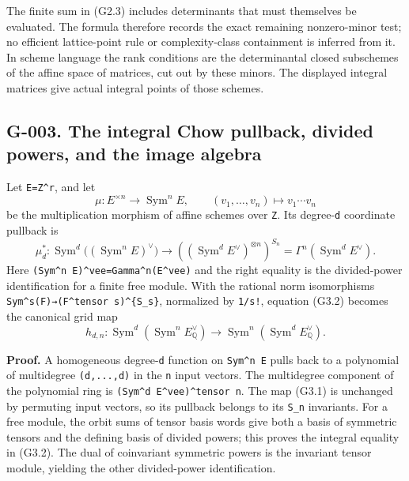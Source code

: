 \documentclass[
  10pt,
]{article}
\begin{document}
The finite sum in (G2.3) includes determinants that must themselves be
evaluated. The formula therefore records the exact remaining
nonzero-minor test; no efficient lattice-point rule or complexity-class
containment is inferred from it. In scheme language the rank conditions
are the determinantal closed subschemes of the affine space of matrices,
cut out by these minors. The displayed integral matrices give actual
integral points of those schemes.

\subsection{G-003. The integral Chow pullback, divided powers, and the
image
algebra}\label{g-003.-the-integral-chow-pullback-divided-powers-and-the-image-algebra}

Let \texttt{\small E=\allowbreak{}Z\textasciicircum{}r}, and let \[
\mu:E^{\times n}\longrightarrow\operatorname{Sym}^n E,
\qquad(v_1,\ldots,v_n)\longmapsto v_1\cdots v_n
\tag{G3.1}
\] be the multiplication morphism of affine schemes over
\texttt{\small Z}. Its degree-\texttt{\small d} coordinate pullback is
\[
\mu_d^*:
\operatorname{Sym}^d\bigl((\operatorname{Sym}^nE)^\vee\bigr)
\longrightarrow
\left((\operatorname{Sym}^d E^\vee)^{\otimes n}\right)^{S_n}
=\Gamma^n(\operatorname{Sym}^dE^\vee).
\tag{G3.2}
\] Here
\texttt{\small (\allowbreak{}Sym\textasciicircum{}n E)\allowbreak{}\textasciicircum{}vee=\allowbreak{}Gamma\textasciicircum{}n(\allowbreak{}E\textasciicircum{}vee)\allowbreak{}}
and the right equality is the divided-power identification for a finite
free module. With the rational norm isomorphisms
\texttt{\small Sym\textasciicircum{}s(\allowbreak{}F)\allowbreak{}→\allowbreak{}(\allowbreak{}F\textasciicircum{}tensor s)\allowbreak{}\textasciicircum{}\{S\_\allowbreak{}s\}},
normalized by \texttt{\small 1/\allowbreak{}s!}, equation (G3.2) becomes
the canonical grid map \[
h_{d,n}:\operatorname{Sym}^d(\operatorname{Sym}^n E_{\mathbb Q}^\vee)
\longrightarrow\operatorname{Sym}^n(\operatorname{Sym}^d E_{\mathbb Q}^\vee).
\tag{G3.3}
\]

\textbf{Proof.} A homogeneous degree-\texttt{\small d} function on
\texttt{\small Sym\textasciicircum{}n E} pulls back to a polynomial of
multidegree
\texttt{\small (\allowbreak{}d,\allowbreak{}...,\allowbreak{}d)\allowbreak{}}
in the \texttt{\small n} input vectors. The multidegree component of the
polynomial ring is
\texttt{\small (\allowbreak{}Sym\textasciicircum{}d E\textasciicircum{}vee)\allowbreak{}\textasciicircum{}tensor n}.
The map (G3.1) is unchanged by permuting input vectors, so its pullback
belongs to its \texttt{\small S\_\allowbreak{}n} invariants. For a free
module, the orbit sums of tensor basis words give both a basis of
symmetric tensors and the defining basis of divided powers; this proves
the integral equality in (G3.2). The dual of coinvariant symmetric
powers is the invariant tensor module, yielding the other divided-power
identification.
\end{document}
